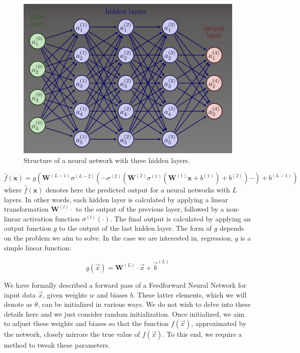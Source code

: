 \begin{figure}[ht]
\centering
\includegraphics[width=\textwidth]{imgs/Architecture-perceptron-multi-couches-2.png}
\caption{Structure of a neural network with three hidden layers.}
\label{fig:mlp}
\end{figure}

\begin{equation}
\label{eq:mlp}
\hat{f}(\mathbf{x}) = g\left( \mathbf{W}^{(L-1)} \sigma^{(L-2)} \left( \cdots \sigma^{(2)} \left(
\mathbf{W}^{(2)} \sigma^{(1)} \left( \mathbf{W}^{(1)} \mathbf{x} + b^{(1)} \right) + b^{(2)} \right) \cdots \right) +
b^{(L-1)} \right)
\end{equation}
where $\hat{f}(\mathbf{x})$ denotes here the predicted output for a neural networks with $L$ layers. In other words, each hidden layer is calculated by applying a linear transformation $\mathbf{W}^{(l)} \cdot$ to the output of the previous layer, followed by a non-linear activation function $\sigma^{(l)}(\cdot)$. The final output is calculated by applying an output function $g$ to the output of the last hidden layer. The form of $g$ depends on the problem we aim to solve. In the case we are interested in, regression, $g$ is a simple linear function:

\begin{equation}
\label{eq:output-function}
g(\Vec{x}) = \mathbf{W}^{(L)} \cdot \Vec{x} + \Vec{b}^{(L)}
\end{equation}


We have formally described a forward pass of a Feedforward Neural Network for input data $\Vec{x}$, given weights $w$ and biases $b$. These latter elements, which we will denote as $\theta$, can be initialized in various ways. We do not wish to delve into these details here and we just consider random initialization. Once initialized, we aim to adjust these weights and biases so that the function $\hat{f}(\Vec{x})$, approximated by the network, closely mirrors the true value of $f(\Vec{x})$. To this end, we require a method to tweak these parameters.

